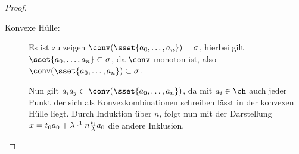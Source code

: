 \begin{Satz}
\begin{proof}
\begin{enumerate}[$a)$:]
\begin{description}
      \item[Konvexe Hülle:] Es ist zu zeigen
        $\conv(\sset{a_0,\ldots , a_n}) = \sigma$, hierbei gilt
        $\sset{a_0,\ldots,a_n} \subset \sigma$, da $\conv$ monoton
        ist, also $\conv(\sset{a_0,\ldots , a_n}) \subset \sigma$.
        
        Nun gilt $a_ia_j \subset \conv( \sset{a_0,\ldots , a_n} )$, da
        mit $a_i \in \ch$ auch jeder Punkt der sich als
        Konvexkombinationen schreiben lässt in der konvexen Hülle
        liegt. Durch Induktion über $n$, folgt nun mit der Darstellung
        $x = t_0 a_0 + \lambda \cdot \sp{1}{n} \frac{t_i}{\lambda}
        a_0$ die andere Inklusion.
        
      
     \end{description}


\end{enumerate}
\end{proof}
\end{Satz}
